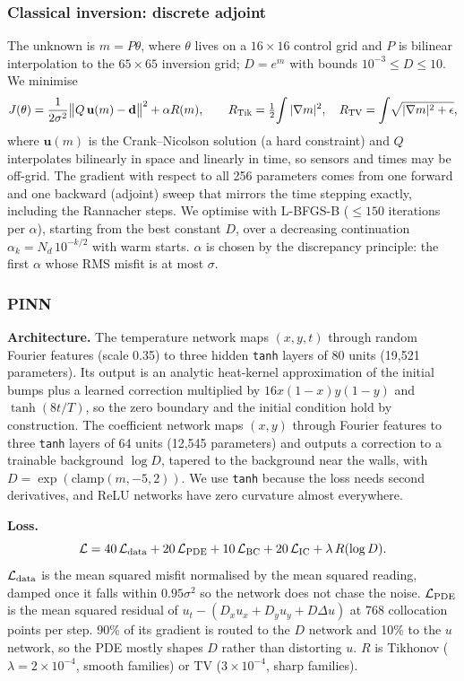 \documentclass[twoside,english]{article}
\begin{document}
\subsubsection{Classical inversion: discrete adjoint}
The unknown is $m=P\theta$, where $\theta$ lives on a $16\times16$ control grid and $P$ is bilinear interpolation to the $65\times65$ inversion grid; $D=e^m$ with bounds $10^{-3}\le D\le 10$. We minimise
\begin{equation}
J(\theta)=\frac{1}{2\sigma^2}\big\|Q\,\mathbf u(m)-\mathbf d\big\|^2+\alpha R(m),\qquad R_{\rm Tik}=\tfrac12\!\int|\nabla m|^2,\quad R_{\rm TV}=\int\!\sqrt{|\nabla m|^2+\epsilon},
\end{equation}
where $\mathbf u(m)$ is the Crank--Nicolson solution (a hard constraint) and $Q$ interpolates bilinearly in space and linearly in time, so sensors and times may be off-grid. The gradient with respect to all 256 parameters comes from one forward and one backward (adjoint) sweep that mirrors the time stepping exactly, including the Rannacher steps. We optimise with L-BFGS-B ($\le150$ iterations per $\alpha$), starting from the best constant $D$, over a decreasing continuation $\alpha_k=N_d\,10^{-k/2}$ with warm starts. $\alpha$ is chosen by the discrepancy principle: the first $\alpha$ whose RMS misfit is at most $\sigma$.

\subsubsection{PINN}
\textbf{Architecture.} The temperature network maps $(x,y,t)$ through random Fourier features (scale 0.35) to three hidden \texttt{tanh} layers of 80 units (19{,}521 parameters). Its output is an analytic heat-kernel approximation of the initial bumps plus a learned correction multiplied by $16x(1-x)y(1-y)$ and $\tanh(8t/T)$, so the zero boundary and the initial condition hold by construction. The coefficient network maps $(x,y)$ through Fourier features to three \texttt{tanh} layers of 64 units (12{,}545 parameters) and outputs a correction to a trainable background $\log D$, tapered to the background near the walls, with $D=\exp(\mathrm{clamp}(m,-5,2))$. We use \texttt{tanh} because the loss needs second derivatives, and ReLU networks have zero curvature almost everywhere.

\textbf{Loss.}
\begin{equation}
\mathcal L = 40\,\mathcal L_{\rm data}+20\,\mathcal L_{\rm PDE}+10\,\mathcal L_{\rm BC}+20\,\mathcal L_{\rm IC}+\lambda\,R(\log D).
\end{equation}
$\mathcal L_{\rm data}$ is the mean squared misfit normalised by the mean squared reading, damped once it falls within $0.95\sigma^2$ so the network does not chase the noise. $\mathcal L_{\rm PDE}$ is the mean squared residual of $u_t-(D_xu_x+D_yu_y+D\Delta u)$ at 768 collocation points per step. 90\% of its gradient is routed to the $D$ network and 10\% to the $u$ network, so the PDE mostly shapes $D$ rather than distorting $u$. $R$ is Tikhonov ($\lambda=2\times10^{-4}$, smooth families) or TV ($3\times10^{-4}$, sharp families).
\end{document}
